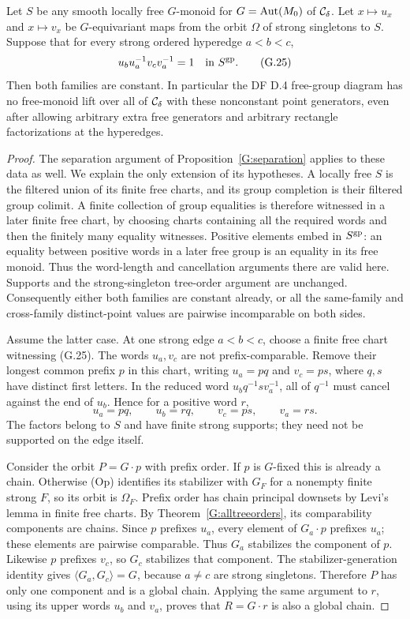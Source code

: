 \begin{theorem}
\label{G:noincidencelift}
Let $S$ be any smooth locally free $G$-monoid for
$G=\operatorname{Aut}(M_0)$ of $\mathcal C_\delta$. Let $x\mapsto u_x$ and
$x\mapsto v_x$ be $G$-equivariant maps from the orbit
$\Omega$ of strong singletons to $S$. Suppose that for
every strong ordered hyperedge $a<b<c$,
\[
 u_bu_a^{-1}v_c v_a^{-1}=1\quad\text{in }S^{\mathrm{gp}}.
 \tag{G.25}
\]
Then both families are constant. In particular the DF D.4
free-group diagram has no free-monoid lift over all of
$\mathcal C_\delta$ with these nonconstant point generators, even after
allowing arbitrary extra free generators and arbitrary
rectangle factorizations at the hyperedges.
\end{theorem}
\begin{proof}
The separation argument of Proposition~\ref{G:separation}
applies to these data as well. We explain the only extension
of its hypotheses. A locally free $S$ is the filtered union
of its finite free charts, and its group completion is their
filtered group colimit. A finite collection of group
equalities is therefore witnessed in a later finite free
chart, by choosing charts containing all the required words
and then the finitely many equality witnesses. Positive
elements embed in $S^{\mathrm{gp}}$: an equality between positive
words in a later free group is an equality in its free
monoid. Thus the word-length and cancellation arguments
there are valid here. Supports and the strong-singleton
tree-order argument are unchanged. Consequently either
both families are constant already, or all the same-family
and cross-family distinct-point values are pairwise
incomparable on both sides.

Assume the latter case. At one strong edge $a<b<c$, choose
a finite free chart witnessing (G.25). The words $u_a,v_c$
are not prefix-comparable. Remove their longest common
prefix $p$ in this chart, writing $u_a=pq$ and $v_c=ps$,
where $q,s$ have distinct first letters. In the reduced word
$u_bq^{-1}s v_a^{-1}$, all of $q^{-1}$ must cancel against
the end of $u_b$. Hence for a positive word $r$,
\[
 u_a=pq,\qquad u_b=rq,\qquad
 v_c=ps,\qquad v_a=rs.
 \tag{G.26}
\]
The factors belong to $S$ and have finite strong supports;
they need not be supported on the edge itself.

Consider the orbit $P=G\cdot p$ with prefix order. If $p$ is
$G$-fixed this is already a chain. Otherwise (Op) identifies
its stabilizer with $G_F$ for a nonempty finite strong $F$,
so its orbit is $\Omega_F$. Prefix order has chain principal
downsets by Levi's lemma in finite free charts. By
Theorem~\ref{G:alltreeorders}, its comparability components
are chains. Since $p$ prefixes $u_a$, every element of
$G_a\cdot p$ prefixes $u_a$; these elements are pairwise
comparable. Thus $G_a$ stabilizes the component of $p$.
Likewise $p$ prefixes $v_c$, so $G_c$ stabilizes that component.
The stabilizer-generation identity gives
$\langle G_a,G_c\rangle=G$, because $a\ne c$ are strong
singletons. Therefore $P$ has only one component and is a
global chain. Applying the same argument to $r$, using its
upper words $u_b$ and $v_a$, proves that $R=G\cdot r$ is
also a global chain.


\end{proof}
